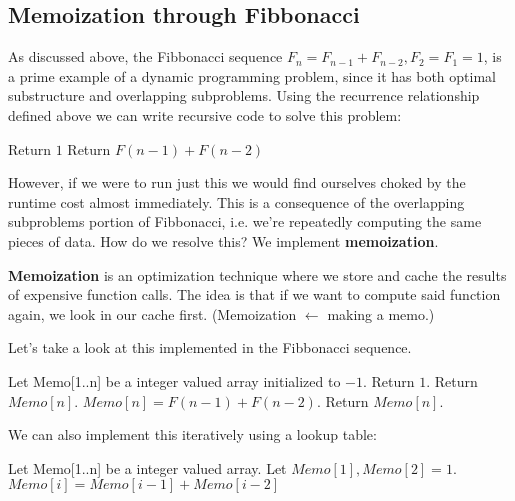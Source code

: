 \subsection{Memoization through Fibbonacci}

As discussed above, the Fibbonacci sequence $F_n = F_{n-1} + F_{n-2}, F_2 = F_1
= 1$, is a prime example of a dynamic programming problem, since it has both
optimal substructure and overlapping subproblems. Using the recurrence
relationship defined above we can write recursive code to solve this problem:

\begin{algorithmic}[1]
		\State Return $1$
	\Else
		\State Return $F(n-1)+F(n-2)$
	\EndIf
\EndProcedure
\end{algorithmic}

However, if we were to run just this we would find ourselves choked by the
runtime cost almost immediately. This is a consequence of the overlapping
subproblems portion of Fibbonacci, i.e. we're repeatedly computing the same
pieces of data. How do we resolve this? We implement \textbf{memoization}.

\begin{definition*}
\textbf{Memoization} is an optimization technique where we store and cache the
results of expensive function calls. The idea is that if we want to compute said
function again, we look in our cache first. (Memoization $\gets$ making a memo.)
\end{definition*}

Let's take a look at this implemented in the Fibbonacci sequence.

\begin{algorithmic}[1]
\State Let Memo[1..n] be a integer valued array initialized to $-1$.
		\State Return $1$.
	 
		\State Return $Memo[n]$. 
	\Else {}
		\State $Memo[n] = F(n-1)+F(n-2)$.
		\State Return $Memo[n]$. 
	\EndIf
\EndProcedure
\end{algorithmic}

We can also implement this iteratively using a lookup table:

\begin{algorithmic}[1]
	\State Let Memo[1..n] be a integer valued array.
	\State Let $Memo[1], Memo[2] = 1$.
		\State $Memo[i] = Memo[i-1] + Memo[i-2]$
	\EndFor
\EndProcedure
\end{algorithmic}

